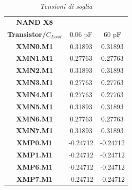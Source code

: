 \begin{table}[!h]\footnotesize
	\centering
	\begin{tabular}{|c|c|c|}
		\hline
		\textbf{NAND X8} &&\\
		
		\textbf{Transistor/$C_{Load}$}&0.06 pF & 60 pF\\
		\hline
		\textbf{XMN0.M1} &0.31893&0.31893\\
		
		\textbf{XMN1.M1} &0.27763&0.27763 \\
		
		\textbf{XMN2.M1} &0.31893&0.31893\\
		
		\textbf{XMN3.M1} &0.27763&0.27763 \\
		\textbf{XMN4.M1} &0.27763&0.27763 \\
		\textbf{XMN5.M1} &0.31893&0.31893\\
		
		\textbf{XMN6.M1} &0.27763&0.27763 \\
		\textbf{XMN7.M1} &0.31893&0.31893\\
		
		\textbf{XMP0.M1}&-0.24712&-0.24712 \\
		
		\textbf{XMP1.M1}&-0.24712&-0.24712\\
		\textbf{XMP6.M1}&-0.24712&-0.24712 \\
		
		\textbf{XMP7.M1}&-0.24712&-0.24712\\
		
		\hline
	\end{tabular}
	\caption{\textit{Tensioni di soglia}}
	\label{Tab5_12}
\end{table}

